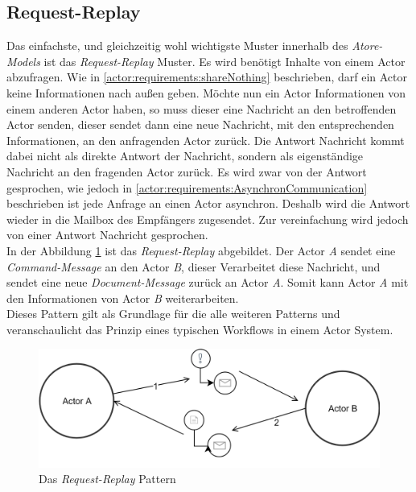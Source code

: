 \subsection{Request-Replay}
Das einfachste, und gleichzeitig wohl wichtigste Muster innerhalb des \textit{Atore-Models} ist das \textit{Request-Replay} Muster. Es wird benötigt Inhalte von einem Actor abzufragen. Wie in \ref{actor:requirements:shareNothing} beschrieben, darf ein Actor keine Informationen nach außen geben. Möchte nun ein Actor Informationen von einem anderen Actor haben, so muss dieser eine Nachricht an den betroffenden Actor senden, dieser sendet dann eine neue Nachricht, mit den entsprechenden Informationen, an den anfragenden Actor zurück. Die Antwort Nachricht kommt dabei nicht als direkte Antwort der Nachricht, sondern als eigenständige Nachricht an den fragenden Actor zurück. Es wird zwar von der Antwort gesprochen, wie jedoch in \ref{actor:requirements:AsynchronCommunication} beschrieben ist jede Anfrage an einen Actor asynchron. Deshalb wird die Antwort wieder in die Mailbox des Empfängers zugesendet. Zur vereinfachung wird jedoch von einer Antwort Nachricht gesprochen. \\
In der Abbildung \ref{fig:actor:patterns:requestReplay} ist das \textit{Request-Replay} abgebildet. Der Actor \textit{A} sendet eine \textit{Command-Message} an den Actor \textit{B}, dieser Verarbeitet diese Nachricht, und sendet eine neue \textit{Document-Message} zurück an Actor \textit{A}. Somit kann Actor \textit{A} mit den Informationen von Actor \textit{B} weiterarbeiten.  \\
Dieses Pattern gilt als Grundlage für die alle weiteren Patterns und veranschaulicht das Prinzip eines typischen Workflows in einem Actor System. \citep{Vernon2015ReactiveAkka}
\begin{figure}
    \centering
    \includegraphics[width=\linewidth]{gfx/actor/patterns/requestReplay}
    \caption{Das \textit{Request-Replay} Pattern}
    \label{fig:actor:patterns:requestReplay}
\end{figure}

